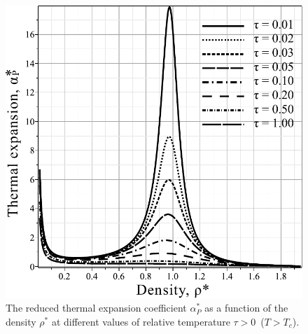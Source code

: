 \documentclass[fleqn,twoside,twocolumn,nofootinbib,showkeys]{revtex4} %
\begin{document}
	\begin{figure}[h!] 
		\includegraphics[width=\column]{f4a.pdf}
		\vskip-3mm
		\caption{The reduced thermal expansion coefficient $\alpha^*_P$ as a function of the density $\rho^*$ at different values of relative temperature $\tau > 0$~($T > T_c$). 
		}
		\label{fig4a}
	\end{figure}
	
\end{document}
